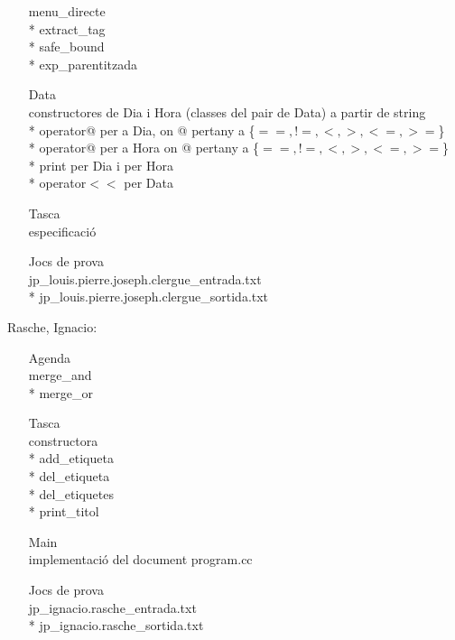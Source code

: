 \documentclass[a4paper,10pt]{article}
\begin{document}
\begin{description}
\begin{enumerate}
    menu\_directe \\*
    extract\_tag \\*
    safe\_bound \\*
    exp\_parentitzada
    \item[Data] \hfill \\
    constructores de Dia i Hora (classes del pair de Data) a partir de string \\*
    operator@ per a Dia, on @ pertany a \{$==, !=, <, >, <=, >=$\} \\*
    operator@ per a Hora on @ pertany a \{$==, !=, <, >, <=, >=$\} \\*
    print per Dia i per Hora \\*
    operator$<<$ per Data
    \item[Tasca] \hfill \\
    especificació
    \item[Jocs de prova] \hfill \\
    jp\_louis.pierre.joseph.clergue\_entrada.txt \\*
    jp\_louis.pierre.joseph.clergue\_sortida.txt
  \end{enumerate}
  \item \textsf{Rasche, Ignacio}:
  \begin{enumerate}
    \item[Agenda] \hfill \\
    merge\_and \\*
    merge\_or
    \item[Tasca] \hfill \\
    constructora \\*
    add\_etiqueta \\*
    del\_etiqueta \\*
    del\_etiquetes \\*
    print\_titol
    \item[Main] \hfill \\
    implementació del document program.cc
    \item[Jocs de prova] \hfill \\
    jp\_ignacio.rasche\_entrada.txt \\*
    jp\_ignacio.rasche\_sortida.txt    
  \end{enumerate}
\end{description}
\end{document}
